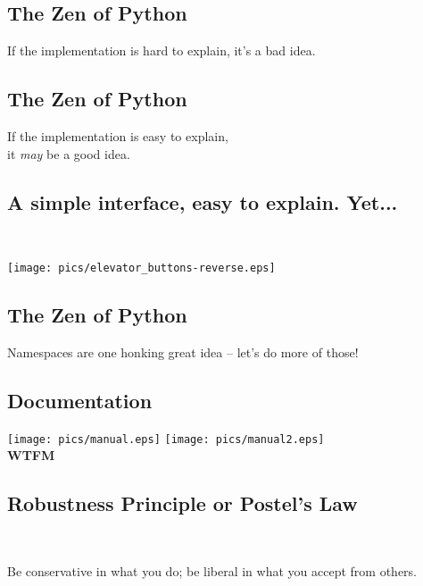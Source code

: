 \documentclass[xga]{xdvislides}
\begin{document}
\subsection{The Zen of Python}
\begin{center}
    If the implementation is hard to explain, it's a bad idea.
\end{center}

\subsection{The Zen of Python}
\begin{center}
    If the implementation is easy to explain, \\
	it {\em may} be a good idea.
\end{center}

\subsection{A simple interface, easy to explain.  Yet...}
\\
\vspace*{\fill}
\begin{center}
	\texttt{[image: pics/elevator\_buttons-reverse.eps]}
\end{center}
\vspace*{\fill}


\subsection{The Zen of Python}
\begin{center}
    Namespaces are one honking great idea -- let's do more of those!
\end{center}
\Normalsize

\subsection{Documentation}
\vspace*{\fill}
\begin{center}
	\texttt{[image: pics/manual.eps]}
	\hspace{.5in}
	\texttt{[image: pics/manual2.eps]}
	\\
	\vspace{.2in}
	\Huge
	{\bf WTFM}
	\Normalsize
\end{center}
\vspace*{\fill}

\subsection{Robustness Principle or Postel's Law}
\\
\Huge
\begin{center}
	Be conservative in what you do; be liberal in what you accept from others.
\end{center}
\Normalsize
\end{document}
